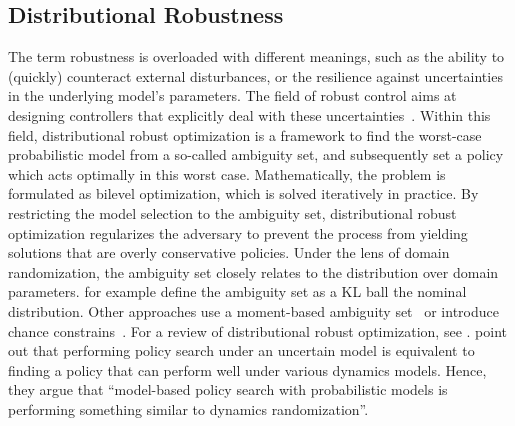 \documentclass[utf8]{frontiersSCNS} %
\begin{document}
\subsection{Distributional Robustness}
\label{sec_sota_distributional_robustness}
The term robustness is overloaded with different meanings, such as the ability to (quickly) counteract external disturbances, or the resilience against uncertainties in the underlying model's parameters.
The field of robust control aims at designing controllers that explicitly deal with these uncertainties~\citep{Zhou_Doyle_98}.
Within this field, distributional robust optimization is a framework to find the worst-case probabilistic model from a so-called ambiguity set, and subsequently set a policy which acts optimally in this worst case.
Mathematically, the problem is formulated as bilevel optimization, which is solved iteratively in practice.
By restricting the model selection to the ambiguity set, distributional robust optimization regularizes the adversary to prevent the process from yielding solutions that are overly conservative policies.
Under the lens of domain randomization, the ambiguity set closely relates to the distribution over domain parameters.
\citet{Abdulsamad_Dorau_Peters_21} for example define the ambiguity set as a \ac{KL} ball the nominal distribution.
Other approaches use a moment-based ambiguity set~\citep{Delage_Ye_10} or introduce chance constrains~\citep{VanPary_Morari_16}.
%
For a review of distributional robust optimization, see \citet{Zhen_Wiesemann_21}.
%
\cite{Chatzilygeroudis_Mouret_20} point out that performing policy search under an uncertain model is equivalent to finding a policy that can perform well under various dynamics models.
Hence, they argue that \enquote{model-based policy search with probabilistic models is performing something similar to dynamics randomization}.

\end{document}
